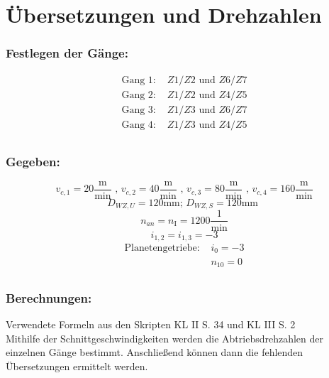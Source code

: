 \section{Übersetzungen und Drehzahlen}
\subsubsection{Festlegen der Gänge: }
\begin{align*}
\text{Gang 1: }& Z1/Z2 \text{ und } Z6/Z7 \\
\text{Gang 2: }& Z1/Z2 \text{ und } Z4/Z5 \\
\text{Gang 3: }& Z1/Z3 \text{ und } Z6/Z7 \\
\text{Gang 4: }& Z1/Z3 \text{ und } Z4/Z5 \\
\end{align*}
\subsubsection{Gegeben: }
\begin{center}
\[
	v_{c,1} = 20 \frac{\text{m}}{\text{min}} \text{ , } v_{c,2} = 40 \frac{\text{m}}{\text{min}} \text{ , } v_{c,3} = 80 \frac{\text{m}}{\text{min}} \text{ , } v_{c,4} = 160 \frac{\text{m}}{\text{min}}
\]
\[
	D_{WZ,U} = 120 \text{mm; }
	D_{WZ,S} = 120 \text{mm }
\]
\[
	n_{an} = n_{\mathord{\mathrm{I}}}= 1200 \frac{1}{\text{min}}
\]
\[
	i_{1,2} =  i_{1,3} = -3
\]
 \begin{align*}
\text{Planetengetriebe: }
		&i_{0} = -3 \\	
		&n_{10} = 0\\
\end{align*}
\newpage
\subsubsection{Berechnungen:}
\end{center}
Verwendete Formeln aus den Skripten KL II S. 34 und KL III S. 2 \\
Mithilfe der Schnittgeschwindigkeiten werden die Abtriebsdrehzahlen der einzelnen Gänge bestimmt. Anschließend können dann die fehlenden Übersetzungen ermittelt werden.
